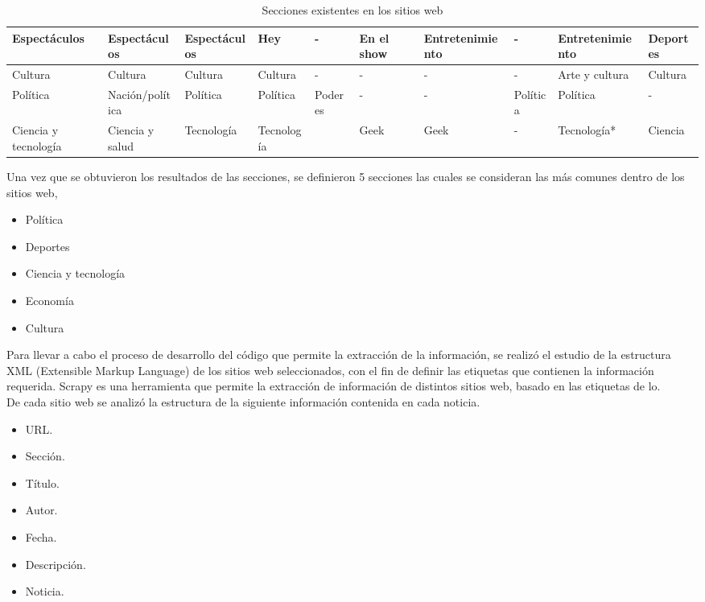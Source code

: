 \begin{table}[htbp]
{\begin{tabular}[H]{|l|l|l|l|l|l|l|l|l|l|}
        Espectáculos  & Espectáculos  & Espectáculos & Hey           & -                     & En el show    & Entretenimiento & -           & Entretenimiento & Deportes    \\ \hline
        Cultura       & Cultura       & Cultura      & Cultura       & -                     & -             & -         & -                 & Arte y cultura & Cultura   \\ \hline
        Política      & Nación/política & Política   & Política      & Poderes               & -             & -         & Política          & Política      & -   \\ \hline
  Ciencia y tecnología& Ciencia y salud & Tecnología & Tecnología    &                       & Geek          & Geek      & -                 & Tecnología*      & Ciencia  \\ \hline        
    \end{tabular}%
}
\caption[Tabla]{Secciones existentes en los sitios web}
\label{tabla:sitios}
\end{table}
Una vez que se obtuvieron los resultados de las secciones, se definieron 5 secciones las cuales se consideran las más comunes dentro de los sitios web,

\begin{itemize}
    \item Política
    \item Deportes
    \item Ciencia y tecnología
    \item Economía
    \item Cultura
\end{itemize}


Para llevar a cabo el proceso de desarrollo del código que permite la extracción de la información, se realizó el estudio de la estructura XML
(Extensible Markup Language) de los sitios web seleccionados, con el fin de definir las etiquetas que contienen la información requerida.
Scrapy es una herramienta que permite la extracción de información de distintos sitios web, basado en las etiquetas de lo.
\\
De cada sitio web se analizó la estructura de la siguiente información contenida en cada noticia.\\
\begin{itemize}
  \item URL.
  \item Sección.
  \item Título.
  \item Autor.
  \item Fecha.
  \item Descripción.
  \item Noticia.
\end{itemize} 

